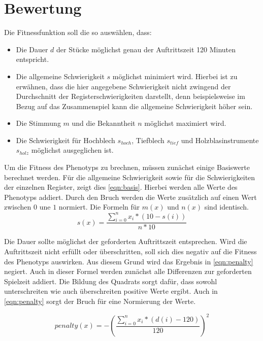 \section{Bewertung}\label{sec:fitness}
Die Fitnessfunktion soll die so auswählen, dass:
\begin{itemize}
    \item Die Dauer $d$ der Stücke möglichst genau der Auftrittszeit 120 Minuten entspricht.
    \item Die allgemeine Schwierigkeit $s$ möglichst minimiert wird. Hierbei ist zu erwähnen, dass die hier
        angegebene Schwierigkeit nicht zwingend der Durchschnitt der Registerschwierigkeiten darstellt, denn
        beispielsweise im Bezug auf das Zusammenspiel kann die allgemeine Schwierigkeit höher sein.
    \item Die Stimmung $m$ und die Bekanntheit $n$ möglichst maximiert wird.
    \item Die Schwierigkeit für Hochblech $s_{hoch}$, Tiefblech $s_{tief}$ und Holzblasinstrumente $s_{holz}$ möglichst ausgeglichen ist.
\end{itemize}
Um die Fitness des Phenotyps zu brechnen, müssen zunächst einige Basiswerte berechnet werden.
Für die allgemeine Schwierigkeit sowie für die Schwierigkeiten der einzelnen Register, zeigt dies \autoref{eqn:basis}. Hierbei werden alle Werte des
Phenotyps addiert. Durch den Bruch werden die Werte zusätzlich auf einen Wert zwischen $0$ une $1$ normiert.
Die Formeln für $m(x)$ und $n(x)$ sind identisch.
\begin{equation}
    s(x) = \frac{\sum_{i=0}^{n} x_i * (10 - s(i)) }{n * 10}
    \label{eqn:basis}
\end{equation}

Die Dauer sollte möglichst der geforderten Auftrittszeit entsprechen. Wird die Auftrittszeit nicht erfüllt
oder überschritten, soll sich dies negativ auf die Fitness des Phenotyps auswirken. Aus diesem Grund wird das
Ergebnis in \autoref{eqn:penalty} negiert. Auch in dieser Formel werden zunächst alle Differenzen zur geforderten
Spielzeit addiert. Die Bildung des Quadrats sorgt dafür, dass sowohl unterschreiten wie auch überschreiten
positive Werte ergibt.
Auch in \autoref{eqn:penalty} sorgt der Bruch für eine Normierung der Werte.

\begin{equation}
    penalty(x) = -\left( \frac{\sum_{i=0}^{n}x_i * (d(i)-120)}{120}\right)^2
    \label{eqn:penalty}
\end{equation}

